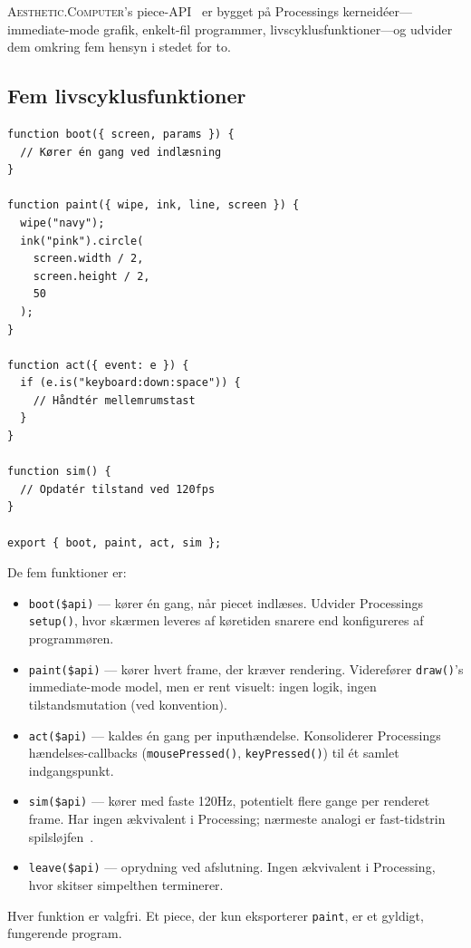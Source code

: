 \documentclass[10pt,letterpaper,twocolumn]{article}
\newcommand{\ac}{\textsc{Aesthetic.Computer}}
\begin{document}
\ac{}'s piece-API~\citep{scudder2026ac} er bygget på Processings kerneidéer---immediate-mode grafik, enkelt-fil programmer, livscyklusfunktioner---og udvider dem omkring fem hensyn i stedet for to.

\subsection{Fem livscyklusfunktioner}

\begin{lstlisting}[style=acjsstyle,caption={Minimalt AC piece.}]
function boot({ screen, params }) {
  // Kører én gang ved indlæsning
}

function paint({ wipe, ink, line, screen }) {
  wipe("navy");
  ink("pink").circle(
    screen.width / 2,
    screen.height / 2,
    50
  );
}

function act({ event: e }) {
  if (e.is("keyboard:down:space")) {
    // Håndtér mellemrumstast
  }
}

function sim() {
  // Opdatér tilstand ved 120fps
}

export { boot, paint, act, sim };
\end{lstlisting}

De fem funktioner er:

\begin{itemize}
  \item \texttt{boot(\$api)} --- kører én gang, når piecet indlæses. Udvider Processings \texttt{setup()}, hvor skærmen leveres af køretiden snarere end konfigureres af programmøren.
  \item \texttt{paint(\$api)} --- kører hvert frame, der kræver rendering. Viderefører \texttt{draw()}'s immediate-mode model, men er rent visuelt: ingen logik, ingen tilstandsmutation (ved konvention).
  \item \texttt{act(\$api)} --- kaldes én gang per inputhændelse. Konsoliderer Processings hændelses-callbacks (\texttt{mousePressed()}, \texttt{keyPressed()}) til ét samlet indgangspunkt.
  \item \texttt{sim(\$api)} --- kører med faste 120Hz, potentielt flere gange per renderet frame. Har ingen ækvivalent i Processing; nærmeste analogi er fast-tidstrin spilsløjfen~\citep{nystrom2014game}.
  \item \texttt{leave(\$api)} --- oprydning ved afslutning. Ingen ækvivalent i Processing, hvor skitser simpelthen terminerer.
\end{itemize}

Hver funktion er valgfri. Et piece, der kun eksporterer \texttt{paint}, er et gyldigt, fungerende program.
\end{document}
